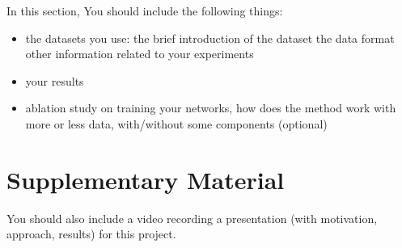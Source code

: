 \documentclass{article}
\begin{document}
In this section, You should include the following things:

\begin{itemize}
    \item the datasets you use:
        \subitem the brief introduction of the dataset
        \subitem the data format
        \subitem other information related to your experiments
    \item your results
    \item ablation study on training your networks, how does the method work with more or less data, with/without some components (optional)
\end{itemize}


\section{Supplementary Material}

You should also include a video recording a presentation (with motivation, approach, results) for this project. 



\end{document}
